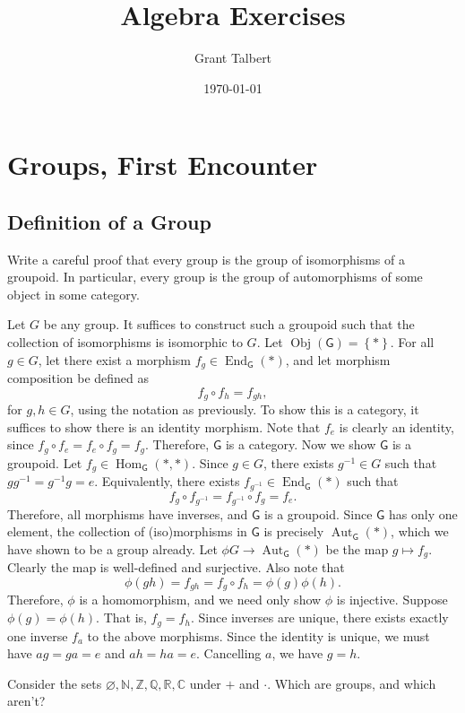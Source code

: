 \documentclass[11pt]{report}
\title{Algebra Exercises}
\author{Grant Talbert}
\date{\today}
\DeclareMathOperator{\End}{End}
\DeclareMathOperator{\Hom}{Hom}
\DeclareMathOperator{\Obj}{Obj}
\DeclareMathOperator{\Aut}{Aut}
\begin{document}
\chapter{Groups, First Encounter}
\section{Definition of a Group}
\begin{exercise}
	Write a careful proof that every group is the group of isomorphisms of a groupoid. In particular, every group is the group of automorphisms of some object in some category.
\end{exercise}
\begin{solution}
	Let $G$ be any group. It suffices to construct such a groupoid such that the collection of isomorphisms is isomorphic to $G$. Let $\Obj(\mathsf{G} ) =\left\{ * \right\} $. For all $g\in G$, let there exist a morphism $f_g \in \End_{\mathsf{G} }(*) $, and let morphism composition be defined as
	\[
		f_g \circ f_h = f_{gh} 
	,\]
	for $g,h\in G$, using the notation as previously. To show this is a category, it suffices to show there is an identity morphism. Note that $f_e$ is clearly an identity, since $f_g \circ f_e = f_e \circ f_g = f_g$. Therefore, $\mathsf{G} $ is a category. Now we show $\mathsf{G} $ is a groupoid. Let $f_g\in \Hom_{\mathsf{G} }(*, *) $. Since $g\in G$, there exists $g^{-1} \in G$ such that $gg^{-1} =g^{-1} g=e$. Equivalently, there exists $f_{g^{-1} } \in \End_{\mathsf{G} }(*) $ such that
	\[
		f_g \circ f_{g^{-1} } =f_{g^{-1} } \circ f_g = f_e
	.\]
	Therefore, all morphisms have inverses, and $\mathsf{G} $ is a groupoid. Since $\mathsf{G} $ has only one element, the collection of (iso)morphisms in $\mathsf{G} $ is precisely $\Aut_{\mathsf{G} } (*) $, which we have shown to be a group already. Let $\phi G \to \Aut_{\mathsf{G} }(*) $ be the map $g\mapsto f_g$. Clearly the map is well-defined and surjective. Also note that
	\[
		\phi (gh)=f_{gh} =f_g \circ f_h = \phi (g)\phi (h)
	.\]
	Therefore, $\phi $ is a homomorphism, and we need only show $\phi $ is injective. Suppose $\phi (g)=\phi (h)$. That is, $f_g=f_h$. Since inverses are unique, there exists exactly one inverse $f_{a}$ to the above morphisms. Since the identity is unique, we must have $ag=ga=e$ and $ah=ha=e$. Cancelling $a$, we have $g=h$.
\end{solution}
\begin{exercise}
	Consider the sets $\varnothing ,\mathbb{N}, \mathbb{Z} ,\mathbb{Q} ,\mathbb{R} ,\mathbb{C} $ under $+$ and $\cdot $. Which are groups, and which aren't?
\end{exercise}
\end{document}
